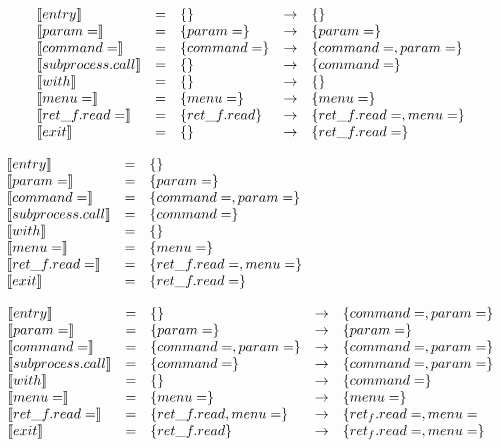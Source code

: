 \begin{frame}
  \[
\begin{array}{lclcl}
  \llbracket entry \rrbracket & = &  \{\} & \rightarrow & \{\}\\
  \llbracket param = \rrbracket & = & \{param =\}& \rightarrow & \{param =\}\\ 
  \llbracket command = \rrbracket & = &\{command =\}& \rightarrow & \{command =, param =\}\\
  \llbracket subprocess.call \rrbracket & = & \{\}& \rightarrow & \{command =\}\\
  \llbracket with \rrbracket & = & \{\}& \rightarrow & \{\}\\
  \llbracket menu = \rrbracket & = &  \{menu = \}& \rightarrow & \{menu =\} \\
  \llbracket ret\_f.read = \rrbracket & = & \{ret\_f.read\}& \rightarrow & \{ret\_f.read=, menu =\}\\
  \llbracket exit \rrbracket & = & \{\}& \rightarrow & \{ret\_f.read=\}\\
\end{array}
\]
\end{frame}


\begin{frame}
  \[
\begin{array}{lclcl}
  \constraint{entry} & = & \{\}& \phantom{\rightarrow} & \phantom{\{command =, param =\}} \\
  \constraint{param =} & = & \{param =\}& \\ 
  \constraint{command =} & = & \{command =, param =\}& \\
  \constraint{subprocess.call} & = & \{command =\}& \\
  \constraint{with} & = & \{\}& \\
  \constraint{menu =} & = & \{menu =\} & \\
  \constraint{ret\_f.read =} & = & \{ret\_f.read=, menu =\}& \\
  \constraint{exit} & = & \{ret\_f.read=\}& \\
\end{array}
\]
\end{frame}


\begin{frame}
  \[
\begin{array}{lclcl}
  \llbracket entry \rrbracket & = & \{\}& \rightarrow & \{command =, param =\} \\
  \llbracket param = \rrbracket & = & \{param =\}& \rightarrow & \{param=\}\\ 
  \llbracket command = \rrbracket & = & \{command =, param =\}& \rightarrow & \{command=, param=\}\\
  \llbracket subprocess.call \rrbracket & = & \{command =\}& \rightarrow & \{command=, param=\}\\
  \llbracket with \rrbracket & = & \{\}& \rightarrow & \{command=\}\\
  \llbracket menu = \rrbracket & = & \{menu =\} & \rightarrow & \{menu=\}\\
  \llbracket ret\_f.read = \rrbracket & = & \{ret\_f.read, menu =\}& \rightarrow & \{ret_f.read=, menu=\\
  \llbracket exit \rrbracket & = & \{ret\_f.read\}& \rightarrow & \{ret_f.read=, menu=\}\\
\end{array}
\]
\end{frame}
